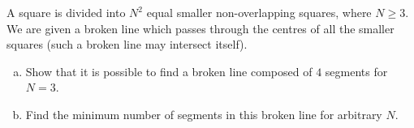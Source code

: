 \documentclass[varwidth]{standalone}
\begin{document}
    A square is divided into $N^2$ equal smaller non-overlapping squares, where $N \geq 3$. We are given a broken line which passes through the centres of all the smaller squares (such a broken line may intersect itself).
    \begin{enumerate}[(a)]
        \item Show that it is possible to find a broken line composed of $4$ segments for $N = 3$.
        \item Find the minimum number of segments in this broken line for arbitrary $N$.
    \end{enumerate}
\end{document}
